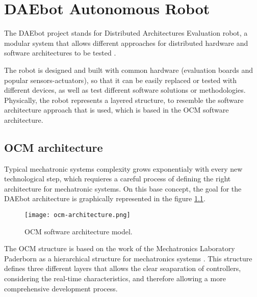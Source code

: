 
\chapter{DAEbot Autonomous Robot}

The DAEbot project stands for Distributed Architectures Evaluation robot, a modular system that allows different approaches for distributed hardware and software architectures to be tested \cite{Wiki}.

The robot is designed and built with common hardware (evaluation boards and popular sensors-actuators), so that it can be easily replaced or tested with different devices, as well as test different software solutions or methodologies. Physically, the robot represents a layered structure, to resemble the software architecture approach that is used, which is based in the OCM software architecture.

\section{OCM architecture}

Typical mechatronic systems complexity grows exponentialy with every new technological step, which requieres a careful process of defining the right architecture for mechatronic systems. On this base concept, the goal for the DAEbot architecture is graphically represented in the figure \ref{fig:ocm}.

\begin{figure}[h]
	\centering
	\texttt{[image: ocm-architecture.png]}
	\caption{OCM software architecture model.} \label{fig:ocm}
\end{figure}

The OCM structure is based on the work of the Mechatronics Laboratory Paderborn as a hierarchical structure for mechatronics systems \cite{Lueckel2001}. This structure defines three different layers that allows the clear seaparation of controllers, considering the real-time characteristics, and therefore allowing a more comprehensive development process.

